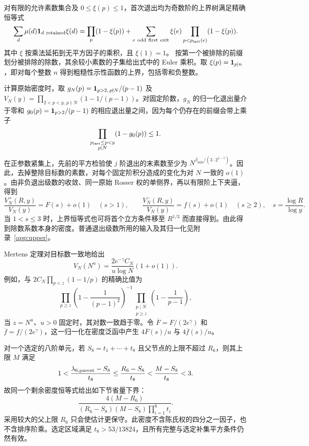 对有限的允许素数集合及 $0\le \xi(p)\le1$，首次退出均为奇数阶的上界树满足精确恒等式
\begin{equation}
 \sum_d\mu(d){\mathbf 1}_{d\ {\rm retained}}\xi(d)
 =\prod_p(1-\xi(p))
   +\sum_{e\ {\rm odd\ first\ exit}}\xi(e)
                      \prod_{p<p_{\rm last}(e)}(1-\xi(p)).
 \label{eq:current-upper-exit}
\end{equation}
其中 $\xi$ 按乘法延拓到无平方因子的乘积，且 $\xi(1)=1$。
按第一个被排除的前缀划分被排除的除数，其余较小素数的子集给出式中的 Euler 乘积。取 $\xi(p)={\mathbf 1}_{p\mid n}$，即对每个整数 $n$ 得到粗糙性示性函数的上界，包括零和负整数。

计算原始密度时，取 $g_N(p)={\mathbf 1}_{p>2,\,p\nmid N}/(p-1)$ 及 $V_N(y)=\prod_{2<p<y,\,p\nmid N}(1-1/(p-1))$。对固定阶数，$g_N$ 的归一化退出量介于零和 $g_0(p)={\mathbf 1}_{p>2}/(p-1)$ 的相应退出量之间，因为每个仍存在的前缀会带上乘子
\[
 \prod_{\substack{p_{\rm last}\le p<y\\p\mid N}}(1-g_0(p))\le1.
\]
在正参数紧集上，先前的平方检验使 $j$ 阶退出的末素数至少为 $N^{\beta_{\min}/(3\cdot2^{j-1})}$。因此，去掉整除目标数的素数，对每个固定阶积分造成的变化为对 $N$ 一致的 $o(1)$。由非负退出级数的收敛、同一原始 Rosser 权的单侧界，再以有限阶上下夹逼，得到
\begin{equation}
 \frac{V_N^+(R,y)}{V_N(y)}=F(s)+o(1)\quad(s>1),\qquad
 \frac{V_N^-(R,y)}{V_N(y)}=f(s)+o(1)\quad(s\ge2),
 \quad s=\frac{\log R}{\log y}.
 \label{eq:current-raw-density}
\end{equation}
当 $1<s\le3$ 时，上界恒等式也可将首个立方条件移至 $R^{1/3}$ 而直接得到。由此得到除数系数本身的密度。普通退出级数所用的输入及其归一化见附录~\ref{app:upper}。

Mertens 定理对目标数一致地给出
\begin{equation}
 V_N(N^u)=\frac{2e^{-\gamma}C_N}{u\log N}(1+o(1)).
 \label{eq:current-mertens}
\end{equation}
例如，与 $2C_N\prod_{p<z}(1-1/p)$ 的精确比值为
\[
 \prod_{p\ge z}\left(1-\frac1{(p-1)^2}\right)^{-1}
 \prod_{\substack{p\mid N\\p\ge z}}\left(1-\frac1{p-1}\right),
\]
当 $z=N^u$、$u>0$ 固定时，其对数一致趋于零。令 $\overline F=F/(2e^\gamma)$ 和 $\overline f=f/(2e^\gamma)$，这一归一化在密度泛函中产生 $4\overline F(s)/u$ 与 $4\overline f(s)/u$。

对一个选定的八阶单元，若 $S_8=t_1+\cdots+t_8$ 且父节点的上限不超过 $R_6$，则其上限 $M$ 满足
\[
 1<\frac{\lambda_{6,\rm parent}-S_8}{t_8}
  \le\frac{R_6-S_8}{t_8}<\frac{M-S_8}{t_8}<3.
\]
故同一个剩余密度恒等式给出如下节省量下界：
\begin{equation}
 \frac{4(M-R_6)}{(R_6-S_8)(M-S_8)\prod_{i=1}^8t_i}.
 \label{eq:current-eighth-saving}
\end{equation}
采用较大的父上限 $R_6$ 只会使估计更保守。此密度不含陈氏权的四分之一因子，也不含排序阶乘。选定区域满足 $t_8>53/13824$，且所有完整与选定补集平方条件仍然有效。

